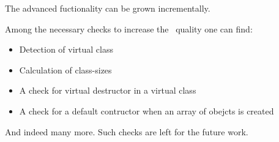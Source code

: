 
The advanced  fuctionality can be grown incrementally. 

Among the necessary checks to increase the \pcpp\ quality one can find:
\begin{itemize}
 \item Detection of virtual class
 \item Calculation of class-sizes
 \item A check for virtual destructor in a virtual class
 \item A check for a default contructor when an array of obejcts is created
\end{itemize}

And indeed many more. Such checks are left for the future work.


